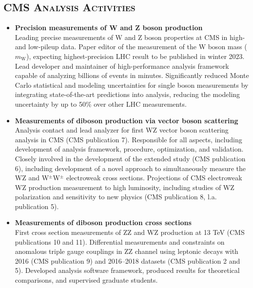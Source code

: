 \documentclass[10pt]{res} %
\begin{document}
\begin{resume}
\section{\textsc{CMS Analysis Activities}}
\begin{itemize}
  \item\textbf{{Precision measurements of W and Z boson production}} \\
    Leading precise measurements of W and Z boson properties at CMS in high- and low-pileup data.
    Paper editor of the measurement of the W boson mass ($m_{\mathrm{W}}$), 
    expecting highest-precision LHC result to be published in winter 2023.
    Lead developer and maintainer of high-performance analysis framework 
    capable of analyzing billions of events in minutes.
    Significantly reduced Monte Carlo statistical and modeling uncertainties
    for single boson measurements by integrating state-of-the-art predictions into
    analysis, reducing the modeling uncertainty by up to 50\% over other LHC measurements.
    
  \item\textbf{{Measurements of diboson production via vector boson scattering}} \\
    Analysis contact and lead analyzer for first WZ vector boson scattering analysis in CMS (CMS publication 7).
    Responsible for all aspects, 
    including development of analysis framework, procedure, optimization, and validation. 
    Closely involved in the development of the extended study (CMS publication 6), including 
    development of a novel approach
    to simultaneously measure the WZ and W$^{\pm}$W$^{\pm}$ electroweak cross sections.
    Projections of CMS electroweak WZ production measurement to high luminosity, including studies of
    WZ polarization and sensitivity to new physics (CMS publication 8, l.a. publication 5). 

  \item\textbf{{Measurements of diboson production cross sections}} \\
    First cross section measurements
    of ZZ and WZ production at 13 TeV (CMS publications 10 and 11). 
    Differential measurements and constraints on anomalous
    triple gauge couplings in ZZ channel using leptonic decays
    with 2016 (CMS publication 9) and 2016--2018 datasets (CMS publication 2 and 5). 
    Developed analysis software framework, produced results for theoretical comparisons, 
    and supervised graduate students.
    
\end{itemize}


\end{resume}
\end{document}
